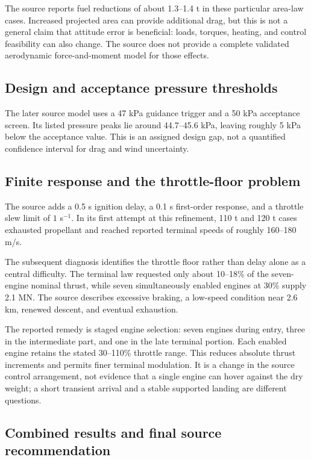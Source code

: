\documentclass[11pt,a4paper]{article}
\begin{document}


The source reports fuel reductions of about 1.3--1.4 t in these particular area-law cases. Increased projected area can provide additional drag, but this is not a general claim that attitude error is beneficial: loads, torques, heating, and control feasibility can also change. The source does not provide a complete validated aerodynamic force-and-moment model for those effects.

\subsection{Design and acceptance pressure thresholds}
The later source model uses a 47 kPa guidance trigger and a 50 kPa acceptance screen. Its listed pressure peaks lie around 44.7--45.6 kPa, leaving roughly 5 kPa below the acceptance value. This is an assigned design gap, not a quantified confidence interval for drag and wind uncertainty.

\subsection{Finite response and the throttle-floor problem}
The source adds a 0.5 s ignition delay, a 0.1 s first-order response, and a throttle slew limit of $1$ s$^{-1}$. In its first attempt at this refinement, 110 t and 120 t cases exhausted propellant and reached reported terminal speeds of roughly 160--180 m/s.

The subsequent diagnosis identifies the throttle floor rather than delay alone as a central difficulty. The terminal law requested only about 10--18\% of the seven-engine nominal thrust, while seven simultaneously enabled engines at 30\% supply 2.1 MN. The source describes excessive braking, a low-speed condition near 2.6 km, renewed descent, and eventual exhaustion.

The reported remedy is staged engine selection: seven engines during entry, three in the intermediate part, and one in the late terminal portion. Each enabled engine retains the stated 30--110\% throttle range. This reduces absolute thrust increments and permits finer terminal modulation. It is a change in the source control arrangement, not evidence that a single engine can hover against the dry weight; a short transient arrival and a stable supported landing are different questions.

\subsection{Combined results and final source recommendation}

\end{document}
